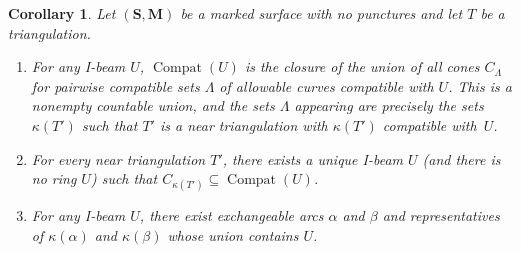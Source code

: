 \documentclass{amsart}
\newtheorem{cor}[proposition]{Corollary}
\theoremstyle{definition}
\theoremstyle{remark}
\numberwithin{equation}{section}
\newcommand{\0}{{\mathbf{0}}}
\newcommand{\M}{\mathbf{M}}
\renewcommand{\S}{\mathbf{S}}
\newcommand{\Compat}{\operatorname{Compat}}
\begin{document}
\begin{cor}\label{wall union no punct}
Let $(\S,\M)$ be a marked surface with no punctures and let $T$ be a triangulation.
\begin{enumerate}[\quad\rm\bf1.]
\item \label{U to T'}
For any I-beam $U$, $\Compat(U)$ is the closure of the union of all cones $C_{\Lambda}$ for pairwise compatible sets $\Lambda$ of allowable curves compatible with $U$.
This is a nonempty countable union, and the sets $\Lambda$ appearing are precisely the sets $\kappa(T')$ such that $T'$ is a near triangulation with $\kappa(T')$ compatible with~$U$.
\item \label{T' to U}
For every near triangulation $T'$, there exists a unique I-beam $U$ (and there is no ring $U$) such that $C_{\kappa(T')}\subseteq\Compat(U)$.
\item \label{U to exch}
For any I-beam $U$, there exist exchangeable arcs $\alpha$ and $\beta$ and representatives of $\kappa(\alpha)$ and $\kappa(\beta)$ whose union contains $U$.
\end{enumerate}
\end{cor}
\end{document}
